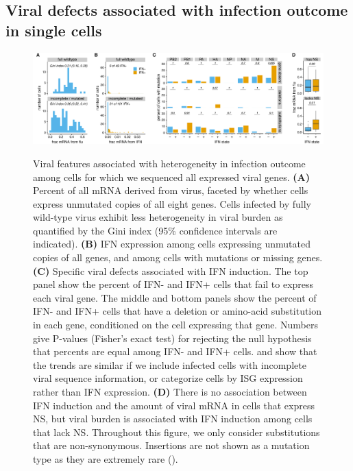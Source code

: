 \documentclass[9pt,lineno]{elife}
\begin{document}
\subsection{Viral defects associated with infection outcome in single cells}

\begin{figure}
\begin{fullwidth}
{\centering
\includegraphics[width=\linewidth]{figures/single_cell_figures/p_mutations.pdf}
}
\caption{
Viral features associated with heterogeneity in infection outcome among cells for which we sequenced all expressed viral genes.
{\bf (A)} 
Percent of all mRNA derived from virus, faceted by whether cells express unmutated copies of all eight genes.
Cells infected by fully wild-type virus exhibit less heterogeneity in viral burden as quantified by the Gini index (95\% confidence intervals are indicated).
{\bf (B)}
IFN expression among cells expressing unmutated copies of all genes, and among cells with mutations or missing genes.
{\bf (C)}
Specific viral defects associated with IFN induction.
The top panel show the percent of IFN- and IFN+ cells that fail to express each viral gene.
The middle and bottom panels show the percent of IFN- and IFN+ cells that have a deletion or amino-acid substitution in each gene, conditioned on the cell expressing that gene.
Numbers give P-values (Fisher's exact test) for rejecting the null hypothesis that percents are equal among IFN- and IFN+ cells. 
 and  show that the trends are similar if we include infected cells with incomplete viral sequence information, or categorize cells by ISG expression rather than IFN expression.
{\bf (D)}
There is no association between IFN induction and the amount of viral mRNA in cells that express NS, but viral burden is associated with IFN induction among cells that lack NS.
Throughout this figure, we only consider substitutions that are non-synonymous.
Insertions are not shown as a mutation type as they are extremely rare ().
}
\label{fig:mutations}


\end{fullwidth}
\end{figure}
\end{document}
